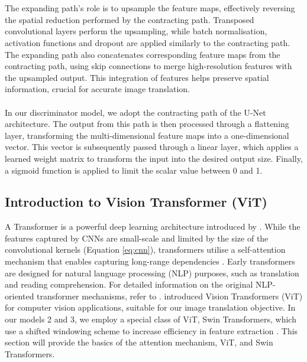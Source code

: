 \\\\
The expanding path's role is to upsample the feature maps, effectively reversing the spatial reduction performed by the contracting path. Transposed convolutional layers perform the upsampling, while batch normalisation, activation functions and dropout are applied similarly to the contracting path. The expanding path also concatenates corresponding feature maps from the contracting path, using skip connections to merge high-resolution features with the upsampled output. This integration of features helps preserve spatial information, crucial for accurate image translation.
\\\\
In our discriminator model, we adopt the contracting path of the U-Net architecture. The output from this path is then processed through a flattening layer, transforming the multi-dimensional feature maps into a one-dimensional vector. This vector is subsequently passed through a linear layer, which applies a learned weight matrix to transform the input into the desired output size. Finally, a sigmoid function is applied to limit the scalar value between 0 and 1.


\subsection{Introduction to Vision Transformer (ViT)}
A Transformer is a powerful deep learning architecture introduced by . While the features captured by CNNs are small-scale and limited by the size of the convolutional kernels (Equation \ref{eq:cnn}), transformers utilise a self-attention mechanism that enables capturing long-range dependencies \cite{vaswani2017attention}. Early transformers are  designed for natural language processing (NLP) purposes, such as translation and reading comprehension. For detailed information on the original NLP-oriented transformer mechanisms, refer to .  introduced Vision Transformers (ViT) for computer vision applications, suitable for our image translation objective. In our models 2 and 3, we employ a special class of ViT, Swin Transformers, which use a shifted windowing scheme to increase efficiency in feature extraction \cite{liu2021swin}. This section will provide the basics of the attention mechanism, ViT, and Swin Transformers.

